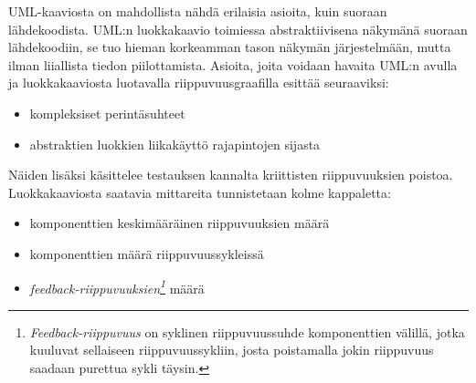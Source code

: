 \documentclass[finnish]{tktltiki2}
\theoremstyle{definition}
\theoremstyle{remark}
\begin{document}

UML-kaaviosta on mahdollista nähdä erilaisia asioita, kuin suoraan lähdekoodista. UML:n luokkakaavio toimiessa abstraktiivisena näkymänä suoraan lähdekoodiin, se tuo hieman korkeamman tason näkymän järjestelmään, mutta ilman liiallista tiedon piilottamista. Asioita, joita voidaan havaita UML:n avulla ja luokkakaaviosta luotavalla riippuvuusgraafilla esittää \citep{baudry_testability_2002} seuraaviksi:

\begin{itemize} 
	\item kompleksiset perintäsuhteet
	\item abstraktien luokkien liikakäyttö rajapintojen sijasta
\end{itemize}


Näiden lisäksi \citep{Jungmayr:2002} käsittelee testauksen kannalta kriittisten riippuvuuksien poistoa. Luokkakaaviosta saatavia mittareita tunnistetaan kolme kappaletta: 

\begin{itemize}
	\item komponenttien keskimääräinen riippuvuuksien määrä
	\item komponenttien määrä riippuvuussykleissä
	\item \textit{feedback-riippuvuuksien\footnote{\textit{Feedback-riippuvuus} on syklinen riippuvuussuhde komponenttien välillä, jotka kuuluvat sellaiseen riippuvuussykliin, josta poistamalla jokin riippuvuus saadaan purettua sykli täysin.}}  määrä 
\end{itemize}




\end{document}
